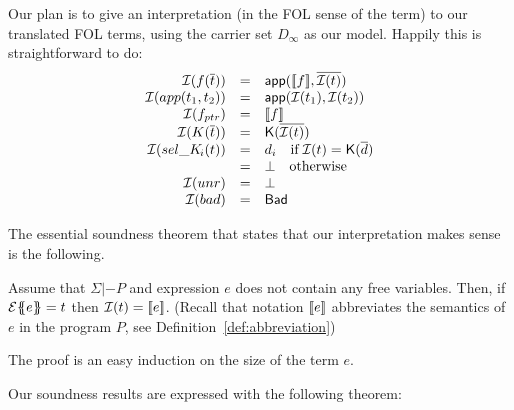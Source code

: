 Our plan is to give an interpretation (in the FOL sense of the term) to our 
translated FOL terms, using the carrier set $D_\infty$ as our model. 
Happily this is straightforward to do:
\[\begin{array}{rcl}
   {\cal I}(f(\overline{t})) & = & \mathsf{app}([\![f]\!],\overline{{\cal I}(t)}) \\
   {\cal I}(app(t_1,t_2))     & = & \mathsf{app}({\cal I}(t_1), {\cal I}(t_2)) \\
   {\cal I}(f_{ptr})  & = & [\![f]\!] \\
   {\cal I}(K(\overline{t})) & = & \mathsf{K}(\overline{{\cal I}(t)}) \\
   {\cal I}(\mathop{sel\_K\!_{i}}(t)) & = &  d_i \quad \mbox{if}\; {\cal I}(t) = \mathsf{K}(\overline{d}) \\
                           & = & \bot \quad \mbox{otherwise} \\
  {\cal I}(unr)       & = & \bot \\
  {\cal I}(bad)       & = & \mathsf{Bad}
\end{array}\]

The essential soundness theorem that states that our interpretation makes sense is
the following.
\begin{theorem}\label{thm:interp-respect}
Assume that $\Sigma |- P$ and expression $e$ does not contain any free variables.
Then, if ${\cal E}\{\!\!\{e\}\!\!\} = t$ 
then ${\cal I}(t) = [\![e]\!]$. (Recall that notation $[\![e]\!]$ abbreviates 
the semantics of $e$ in the program $P$, see Definition~\ref{def:abbreviation})
\end{theorem}
The proof is an easy induction on the size of the term $e$.

Our soundness results are expressed with the following theorem:

